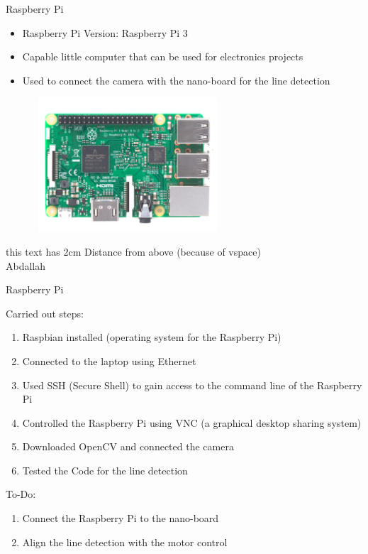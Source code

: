  
\begin{frame}[plain]{Raspberry Pi}
	\begin{itemize}
		\item Raspberry Pi Version: Raspberry Pi 3
		\item Capable little computer that can be used for electronics projects
		\item Used to connect the camera with the nano-board for the line detection
	\end{itemize}
	
	\begin{figure}
	\includegraphics[width=7cm, height=5cm]{raspi2.png}
	\end{figure}
	
	\vspace{2cm}
	this text has 2cm Distance from above (because of vspace)\\ %
	Abdallah
\end{frame}

\begin{frame}[plain]{Raspberry Pi}

Carried out steps:
\begin{enumerate}
		\item Raspbian installed (operating system for the Raspberry Pi)
		\item Connected to the laptop using Ethernet
		\item Used SSH (Secure Shell) to gain access to the command line of the Raspberry Pi
		\item Controlled the Raspberry Pi using VNC (a graphical desktop sharing system)
		\item Downloaded OpenCV and connected the camera
		\item Tested the Code for the line detection
	\end{enumerate}
	

	
To-Do:
\begin{enumerate}
		\item Connect the Raspberry Pi to the nano-board
		\item Align the line detection with the motor control
	\end{enumerate}

\end{frame}


